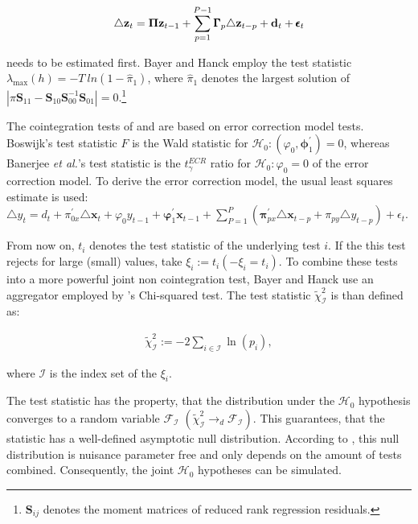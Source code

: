 \documentclass[11pt,a4paper]{article}
\let\rmarkdownfootnote\footnote%
\def\footnote{\protect\rmarkdownfootnote}
\begin{document}
\begin{align}
\triangle {\bf z}_t = {\bf \Pi z}_{t-1} + \sum^{P-1}_{p=1}\pmb{\Gamma}_p \triangle{\bf z}_{t-p} + {\bf d}_t + \pmb{\epsilon}_t
\end{align}

needs to be estimated first. Bayer and Hanck employ the test statistic
\(\lambda_{\max} (h) = - T \ ln(1 - \hat{\pi}_1)\), where
\(\hat{\pi}_1\) denotes the largest solution of
\(|\pi \pmb{S}_{11} - \pmb{S}_{10} \pmb{S}_{00}^{-1} \pmb{S}_{01}|= 0\).\footnote{\(\pmb{S}_{ij}\)
  denotes the moment matrices of reduced rank regression residuals.}

The cointegration tests of \textcite{Boswijk1994} and
\textcite{Banerjee1998} are based on error correction model tests.
Boswijk's test statistic \(\hat{F}\) is the Wald statistic for
\(\mathcal{H}_0: (\varphi_0, \pmb{\phi}_1^{'}) = 0\), whereas Banerjee
\emph{et al.}'s test statistic is the \(t_{\gamma}^{ECR}\) ratio for
\(\mathcal{H}_0 : \varphi_0 = 0\) of the error correction model. To
derive the error correction model, the usual least squares estimate is
used:
\(\triangle y_t = d_t + \pi_{0x}^{'} \triangle \pmb{x}_t + \varphi_0 y_{t-1} + \pmb{\varphi}_{1}^{'} \pmb{x}_{t-1} + \sum_{P = 1}^{P} \left( \pmb{\pi}_{px}^{'} \triangle \pmb{x}_{t-p} + \pi_{py} \triangle y_{t - p} \right) + \epsilon_t\).

From now on, \(t_i\) denotes the test statistic of the underlying test
\(i\). If the this test rejects for large (small) values, take
\(\xi_i := t_i (-\xi_i = t_i)\). To combine these tests into a more
powerful joint non cointegration test, Bayer and Hanck use an aggregator
employed by \textcite{Fisher1925}'s Chi-squared test. The test statistic
\(\tilde{\chi}_{\mathcal{I}}^2\) is than defined as:

\begin{align}
  \label{eq:bayer-hanck}
  \tilde{\chi}_{\mathcal{I}}^{2} := -2 \sum_{i \in \mathcal{I}} \ln(p_i),
\end{align}

where \(\mathcal{I}\) is the index set of the \(\xi_i\).

The test statistic has the property, that the distribution under the
\(\mathcal{H}_0\) hypothesis converges to a random variable
\(\mathcal{F}_{\mathcal{I}}\)
\(\left(\tilde{\chi}_{\mathcal{I}}^{2} \rightarrow_{d} \mathcal{F}_{\mathcal{I}} \right)\).
This guarantees, that the statistic has a well-defined asymptotic null
distribution. According to \textcite{Bayerhanck2009}, this null
distribution is nuisance parameter free and only depends on the amount
of tests combined. Consequently, the joint \(\mathcal{H_0}\) hypotheses
can be simulated.
\end{document}

